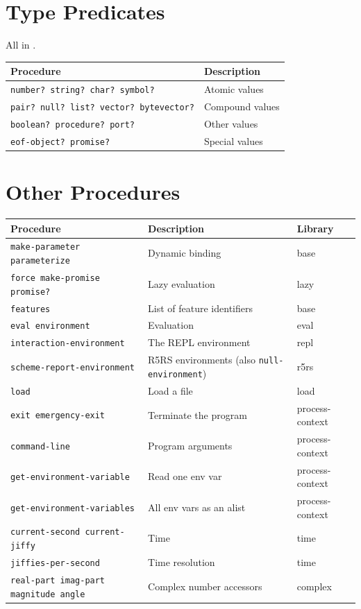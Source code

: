 \section{Type Predicates}

All in .

\begin{center}
\small
\begin{tabularx}{\textwidth}{@{}lY@{}}
\textbf{Procedure} & \textbf{Description} \\
\hline
\texttt{number? string? char? symbol?} & Atomic values \\
\texttt{pair? null? list? vector? bytevector?} & Compound values \\
\texttt{boolean? procedure? port?} & Other values \\
\texttt{eof-object? promise?} & Special values \\
\end{tabularx}
\end{center}

\section{Other Procedures}

\begin{center}
\small
\begin{tabularx}{\textwidth}{@{}p{4.6cm}Yl@{}}
\textbf{Procedure} & \textbf{Description} & \textbf{Library} \\
\hline
\texttt{make-parameter parameterize} & Dynamic binding & base \\
\texttt{force make-promise promise?} & Lazy evaluation & lazy \\
\texttt{features} & List of feature identifiers & base \\
\texttt{eval environment} & Evaluation & eval \\
\texttt{interaction-environment} & The REPL environment & repl \\
\texttt{scheme-report-environment} & R5RS environments (also \texttt{null-environment}) & r5rs \\
\texttt{load} & Load a file & load \\
\texttt{exit emergency-exit} & Terminate the program & process-context \\
\texttt{command-line} & Program arguments & process-context \\
\texttt{get-environment-variable} & Read one env var & process-context \\
\texttt{get-environment-variables} & All env vars as an alist & process-context \\
\texttt{current-second current-jiffy} & Time & time \\
\texttt{jiffies-per-second} & Time resolution & time \\
\texttt{real-part imag-part magnitude angle} & Complex number accessors & complex \\
\end{tabularx}
\end{center}
